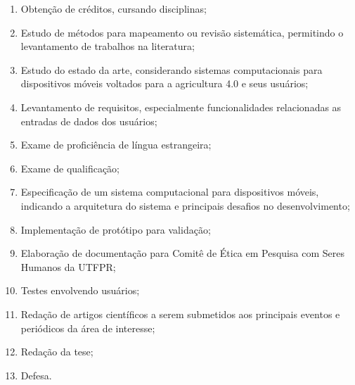 \documentclass[12pt]{article}
\begin{document}
\begin{enumerate}
	\item Obtenção de créditos, cursando disciplinas;
	\item Estudo de métodos para mapeamento ou revisão sistemática, permitindo o levantamento de trabalhos na literatura;
	\item Estudo do estado da arte, considerando sistemas computacionais para dispositivos móveis voltados para a agricultura 4.0 e seus usuários;
	\item Levantamento de requisitos, especialmente funcionalidades relacionadas as entradas de dados dos usuários;
	\item Exame de proficiência de língua estrangeira;
	\item Exame de qualificação;
	\item Especificação de um sistema computacional para dispositivos móveis, indicando a arquitetura do sistema e principais desafios no desenvolvimento;
	\item Implementação de protótipo para validação;
	\item Elaboração de documentação para Comitê de Ética em Pesquisa com Seres Humanos da UTFPR;
	\item Testes envolvendo usuários;
	\item Redação de artigos científicos a serem submetidos aos principais eventos e periódicos da área de interesse;
	\item Redação da tese;
	\item Defesa.
\end{enumerate}
\end{document}
